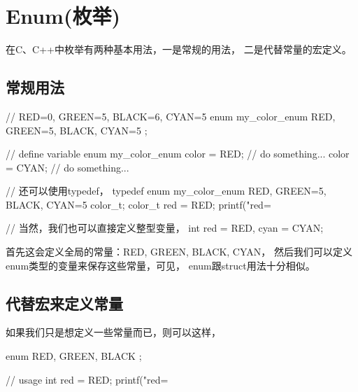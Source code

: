 \section[Enum]{Enum(枚举)}
在C、C++中枚举有两种基本用法，一是常规的用法，
二是代替常量的宏定义。
\subsection[常规用法]{常规用法}
\begin{cppcode}
// RED=0, GREEN=5, BLACK=6, CYAN=5
enum my_color_enum { RED, GREEN=5, BLACK, CYAN=5 };

// define variable
enum my_color_enum color = RED;
// do something...
color = CYAN;
// do something...

// 还可以使用typedef，
typedef enum my_color_enum {
  RED, GREEN=5, BLACK, CYAN=5
} color_t;
color_t red = RED;
printf("red=%

// 当然，我们也可以直接定义整型变量，
int red = RED, cyan = CYAN;
\end{cppcode}

首先这会定义全局的常量：RED, GREEN, BLACK, CYAN，
然后我们可以定义enum类型的变量来保存这些常量，可见，
enum跟struct用法十分相似。

\subsection[代替宏来定义常量]{代替宏来定义常量}
如果我们只是想定义一些常量而已，则可以这样，

\begin{cppcode}
enum { RED, GREEN, BLACK };

// usage
int red = RED;
printf("red=%
\end{cppcode}